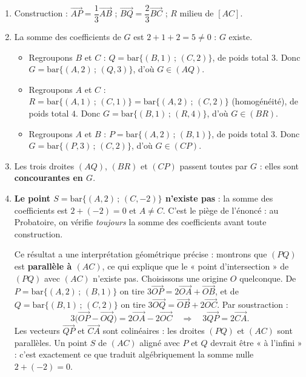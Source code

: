 \documentclass[11pt]{article}
\begin{document}
\begin{corrige}
\begin{enumerate}
\item Construction : $\overrightarrow{AP}=\dfrac13\overrightarrow{AB}$ ; $\overrightarrow{BQ}=\dfrac{2}{3}\overrightarrow{BC}$ ; $R$ milieu de $[AC]$.
\item La somme des coefficients de $G$ est $2+1+2=5\neq 0$ : $G$ existe.
\begin{itemize}
\item Regroupons $B$ et $C$ : $Q=\mathrm{bar}\{(B,1)\,;\,(C,2)\}$, de poids total $3$. Donc $G=\mathrm{bar}\{(A,2)\,;\,(Q,3)\}$, d'où $G\in(AQ)$.
\item Regroupons $A$ et $C$ : $R=\mathrm{bar}\{(A,1)\,;\,(C,1)\}=\mathrm{bar}\{(A,2)\,;\,(C,2)\}$ (homogénéité), de poids total $4$. Donc $G=\mathrm{bar}\{(B,1)\,;\,(R,4)\}$, d'où $G\in(BR)$.
\item Regroupons $A$ et $B$ : $P=\mathrm{bar}\{(A,2)\,;\,(B,1)\}$, de poids total $3$. Donc $G=\mathrm{bar}\{(P,3)\,;\,(C,2)\}$, d'où $G\in(CP)$.
\end{itemize}
\item Les trois droites $(AQ)$, $(BR)$ et $(CP)$ passent toutes par $G$ : elles sont \textbf{concourantes en $G$}.
\item \textbf{Le point $S=\mathrm{bar}\{(A,2)\,;\,(C,-2)\}$ n'existe pas} : la somme des coefficients est $2+(-2)=0$ et $A\neq C$. C'est le piège de l'énoncé : au Probatoire, on vérifie \emph{toujours} la somme des coefficients avant toute construction.

Ce résultat a une interprétation géométrique précise : montrons que $(PQ)$ est \textbf{parallèle à $(AC)$}, ce qui explique que le « point d'intersection » de $(PQ)$ avec $(AC)$ n'existe pas. Choisissons une origine $O$ quelconque. De $P=\mathrm{bar}\{(A,2)\,;\,(B,1)\}$ on tire $3\overrightarrow{OP}=2\overrightarrow{OA}+\overrightarrow{OB}$, et de $Q=\mathrm{bar}\{(B,1)\,;\,(C,2)\}$ on tire $3\overrightarrow{OQ}=\overrightarrow{OB}+2\overrightarrow{OC}$. Par soustraction :
\[ 3\bigl(\overrightarrow{OP}-\overrightarrow{OQ}\bigr)=2\overrightarrow{OA}-2\overrightarrow{OC}
\quad\Longrightarrow\quad 3\overrightarrow{QP}=2\overrightarrow{CA}. \]
Les vecteurs $\overrightarrow{QP}$ et $\overrightarrow{CA}$ sont colinéaires : les droites $(PQ)$ et $(AC)$ sont parallèles. Un point $S$ de $(AC)$ aligné avec $P$ et $Q$ devrait être « à l'infini » : c'est exactement ce que traduit algébriquement la somme nulle $2+(-2)=0$.
\end{enumerate}
\end{corrige}
\end{document}
